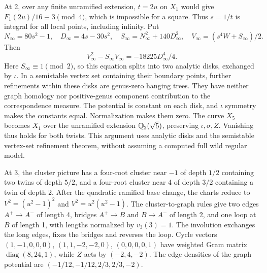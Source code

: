 At 2, over any finite unramified extension, $t=2u$ on $X_1$ would give
$F_1(2u)/16\equiv3\pmod4$, which is impossible for a square. Thus
$s=1/t$ is integral for all local points, including infinity. Put
\[
 N_\infty=80s^2-1,\quad D_\infty=4s-30s^2,\quad
 S_\infty=N_\infty^2+140D_\infty^2,\quad
 V_\infty=(s^4W+S_\infty)/2.
\]
Then
\[
 V_\infty^2-S_\infty V_\infty=-18225D_\infty^4/4.
\]
Here $S_\infty\equiv1\pmod2$, so this equation splits into two
analytic disks, exchanged by $\iota$. In a semistable vertex set
containing their boundary points, further refinements within these
disks are genus-zero hanging trees. They have neither graph homology
nor positive-genus component contribution to the correspondence
measure. The potential is constant on each disk, and $\iota$
symmetry makes the constants equal. Normalization makes them zero.
The curve $X_5$ becomes $X_1$ over the unramified extension
$\mathbb Q_2(\sqrt5)$, preserving $\iota,\sigma,Z$. Vanishing thus
holds for both twists. This argument uses analytic disks and the
semistable vertex-set refinement theorem, without assuming a computed
full wild regular model.

At 3, the cluster picture has a four-root cluster near $-1$ of depth
$1/2$ containing two twins of depth $5/2$, and a four-root cluster near
4 of depth $3/2$ containing a twin of depth 2. After the quadratic
ramified base change, the charts reduce to
$V^2=(u^2-1)^2$ and $V^2=u^2(u^2-1)$. The cluster-to-graph rules give
two edges $A^+\to A^-$ of length 4, bridges $A^+\to B$ and
$B\to A^-$ of length 2, and one loop at $B$ of length 1, with lengths
normalized by $v_3(3)=1$. The involution exchanges the long edges,
fixes the bridges and reverses the loop. Cycle vectors
$(1,-1,0,0,0)$, $(1,1,-2,-2,0)$, $(0,0,0,0,1)$ have weighted
Gram matrix $\operatorname{diag}(8,24,1)$, while $Z$ acts by
$(-2,4,-2)$. The edge densities of the graph potential are
$(-1/12,-1/12,2/3,2/3,-2)$.

